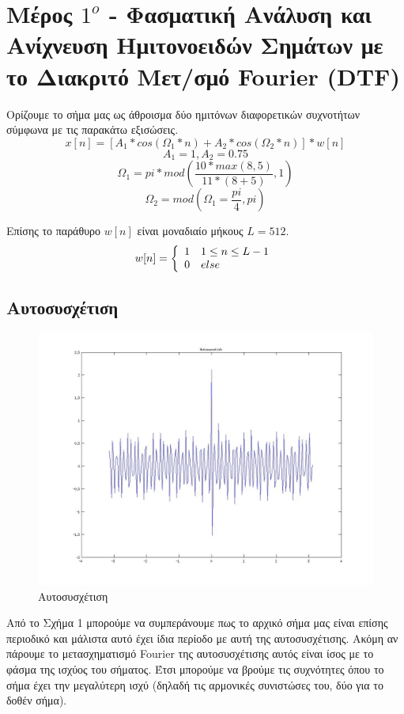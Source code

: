 \documentclass[a4paper,10pt]{article} \usepackage{anysize}
\begin{document}


\section*{Μέρος $1^o$ - Φασματική Ανάλυση και Ανίχνευση Ημιτονοειδών Σημάτων
με το Διακριτό Μετ/σμό Fourier (DTF)}
\setcounter{section}{1}
Ορίζουμε το σήμα μας ως άθροισμα δύο ημιτόνων διαφορετικών συχνοτήτων σύμφωνα
με τις παρακάτω εξισώσεις.
\begin{equation}
x[n]=[A_1*cos(\Omega_1*n)+A_2*cos(\Omega_2*n)]*w[n]
\end{equation}
\begin{equation}
A_1=1 , A_2=0.75
\end{equation}
\begin{equation}
\Omega_1=pi*mod(\frac{10*max(8,5)}{11*(8+5)},1) 
\end{equation}
\begin{equation}
\Omega_2=mod(\Omega_1=\frac{pi}{4},pi)
\end{equation}

Επίσης το παράθυρο $w[n]$ είναι μοναδιαίο μήκους $L=512$.
\begin{equation}
w[n]=\left\{\begin{array}{l l}
1 & 1 \leq n \leq L-1 \\
0 & else \\
\end{array}
\right.
\end{equation}
\subsection{Αυτοσυσχέτιση}


\begin{figure}[H]
\caption{Αυτοσυσχέτιση}
\centering
	\includegraphics[scale=0.4]{files/01-Autosusxetish.jpg}
\end{figure}
Από το Σχήμα 1 μπορούμε να συμπεράνουμε πως το αρχικό σήμα μας είναι επίσης
περιοδικό και μάλιστα αυτό έχει ίδια περίοδο με αυτή της αυτοσυσχέτισης. Ακόμη
αν πάρουμε το μετασχηματισμό Fourier της αυτοσυσχέτισης αυτός είναι ίσος με το
φάσμα της ισχύος του σήματος. Έτσι μπορούμε να βρούμε τις συχνότητες όπου το
σήμα έχει την μεγαλύτερη ισχύ (δηλαδή τις αρμονικές συνιστώσες του, δύο για το
δοθέν σήμα).
\end{document}
